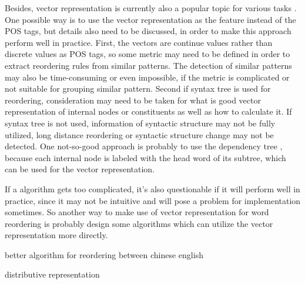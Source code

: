 Besides, vector representation is currently also a popular topic for various tasks \citep{oxford, Mikolov}. One possible way is to use the vector representation as the feature instead of the POS tags, but details also need to be discussed, in order to make this approach perform well in practice. First, the vectors are continue values rather than discrete values as POS tags, so some metric may need to be defined in order to extract reordering rules from similar patterns. The detection of similar patterns may also be time-consuming or even impossible, if the metric is complicated or not suitable for grouping similar pattern. Second if syntax tree is used for reordering, consideration may need to be taken for what is good vector representation of internal nodes or constituents as well as how to calculate it. If syntax tree is not used, information of syntactic structure may not be fully utilized, long distance reordering or syntactic structure change may not be detected. One not-so-good approach is probably to use the dependency tree \citep{depend}, because each internal node is labeled with the head word of its subtree, which can be used for the vector representation. 

If a algorithm gets too complicated, it's also questionable if it will perform well in practice, since it may not be intuitive and will pose a problem for implementation sometimes. So another way to make use of vector representation for word reordering is probably design some algorithms which can utilize the vector representation more directly.




better algorithm for reordering between chinese english

distributive representation